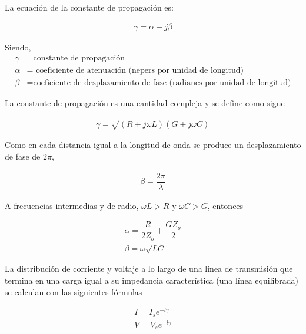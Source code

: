 \begin{itemize}
                La ecuación de la constante de propagación es:

                \begin{gather}
                    \gamma = \alpha + j \beta \label{eq:cons_propagacion}
                \end{gather}

                Siendo, 
                \begin{align*}
                    \gamma &= \text{constante de propagación} \\
                    \alpha &= \text{ coeficiente de atenuación (nepers por unidad de longitud)} \\
                    \beta &= \text{coeficiente de desplazamiento de fase (radianes por unidad de longitud)}
                \end{align*}
                
                La constante de propagación es una cantidad compleja y se define como sigue 

                \begin{gather}
                    \gamma = \sqrt{(R+j\omega L)(G+j \omega C)} \label{eq:cons_propagacion_2}
                \end{gather}

                Como en cada distancia igual a la longitud de onda se produce un desplazamiento de fase de $2 \pi$,

                \begin{gather}
                    \beta = \dfrac{2 \pi}{\lambda} \label{eq:coef_desplazamiento}
                \end{gather}

                A frecuencias intermedias y de radio, $\omega L > R$ y $\omega C > G$, entonces

                \begin{gather}
                    \alpha= \dfrac{R}{2Z_o}+\dfrac{GZ_o}{2} \label{eq:coef_atenuacion} \\[0.2cm]
                    \beta = \omega \sqrt{LC}
                \end{gather}

                La distribución de corriente y voltaje a lo largo de una línea de transmisión que termina en una carga igual a su impedancia característica (una línea equilibrada) se calculan con las siguientes fórmulas

                \begin{gather}
                    I=I_s e^{-l\gamma} \label{eq:corriente} \\[0.2cm]
                    V=V_s e^{-l\gamma} \label{eq:voltaje}
                \end{gather}


\end{itemize}
